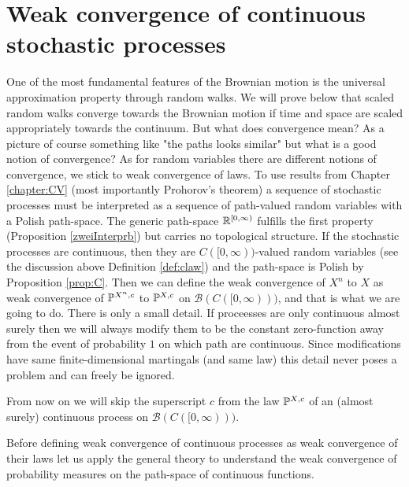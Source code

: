 \section{Weak convergence of continuous stochastic processes}
One of the most fundamental features of the Brownian motion is the universal approximation property through random walks. We will prove below that scaled random walks converge towards the Brownian motion if time and space are scaled appropriately towards the continuum. But what does convergence mean? As a picture of course something like "the paths looks similar"{} but what is a good notion of convergence? As for random variables there are different notions of convergence, we stick to weak convergence of laws. To use results from Chapter \ref{chapter:CV} (most importantly Prohorov's theorem) a sequence of stochastic processes must be interpreted as a sequence of path-valued random variables with a Polish path-space. The generic path-space $\R^{[0,\infty)}$ fulfills the first property (Proposition \ref{zweiInterprb}) but carries no topological structure. If the stochastic processes are continuous, then they are $C([0,\infty))$-valued random variables (see the discussion above Definition \ref{def:claw}) and the path-space is Polish by Proposition \ref{prop:C}. Then we can define the weak convergence of $X^n$ to $X$ as weak convergence of $\P^{X^n,c}$ to $\P^{X,c}$ on $\mathcal B(C([0,\infty)))$, and that is what we are going to do. There is only a small detail. If proceesses are only continuous almost surely then we will always modify them to be the constant zero-function away from the event of probability $1$ on which path are continuous. Since modifications have same finite-dimensional martingals (and same law) this detail never poses a problem and can freely be ignored.
\begin{lwarnhinweis}
	From now on we will skip the superscript $c$ from the law $\P^{X,c}$ of an (almost surely) continuous process on $\mathcal B(C([0,\infty)))$.
\end{lwarnhinweis}
Before defining weak convergence of continuous processes as weak convergence of their laws let us apply the general theory to understand the weak convergence of probability measures on the path-space of continuous functions.
